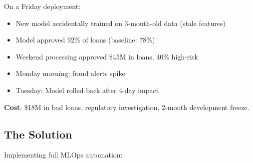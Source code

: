On a Friday deployment:
\begin{itemize}
    \item New model accidentally trained on 3-month-old data (stale features)
    \item Model approved 92\% of loans (baseline: 78\%)
    \item Weekend processing approved \$45M in loans, 40\% high-risk
    \item Monday morning: fraud alerts spike
    \item Tuesday: Model rolled back after 4-day impact
\end{itemize}

\textbf{Cost}: \$18M in bad loans, regulatory investigation, 2-month development freeze.

\subsection{The Solution}

Implementing full MLOps automation:

